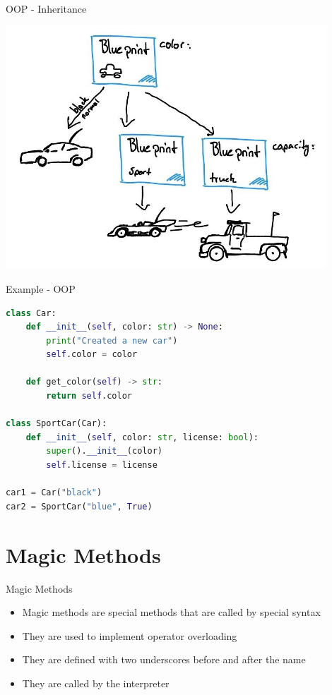 \documentclass{beamer}
\begin{document}
\begin{frame}{OOP - Inheritance}
    \begin{center}
        \includegraphics[width=0.9\textwidth]{figures/full_inheritance.jpg}
    \end{center}
\end{frame}

\begin{frame}[fragile]{Example - OOP}
    \begin{lstlisting}[language=Python]
class Car:
    def __init__(self, color: str) -> None:
        print("Created a new car")
        self.color = color

    def get_color(self) -> str:
        return self.color
        
class SportCar(Car):
    def __init__(self, color: str, license: bool):
        super().__init__(color)
        self.license = license

car1 = Car("black")
car2 = SportCar("blue", True)
    \end{lstlisting}
\end{frame}

\section{Magic Methods}
\begin{frame}{Magic Methods}
    \begin{itemize}
        \item Magic methods are special methods that are called by special syntax
        \item They are used to implement operator overloading
        \item They are defined with two underscores before and after the name
        \item They are called by the interpreter
    \end{itemize}
\end{frame}
\end{document}
